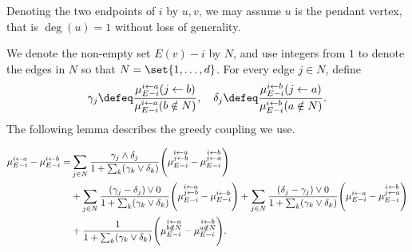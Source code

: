 \documentclass[a4paper,11pt]{article}
\begin{document}
Denoting the two endpoints of $i$ by $u, v$, we may assume $u$ is the pendant vertex, that is $\deg(u) = 1$ without loss of generality.
    
We denote the non-empty set $E(v)-i$ by $N$, and use integers from $1$ to denote the edges in $N$ so that $N = \set{1, \ldots, d}$. For every edge $j\in N$, define
\begin{align*}
    \gamma_j\defeq \frac{\pab}{\pan}, \quad
    \delta_j\defeq \frac{\pba}{\pbn}.
\end{align*}
The following lemma describes the greedy coupling we use.
\begin{lemma}
    \begin{align*}
        \ma-\mb
          =&\sum_{j\in N}\frac{\gamma_j\wedge\delta_j}{\zzz}\Bigg(\mab - \mba\Bigg)
        \\&+\sum_{j\in N}\frac{(\gamma_j-\delta_j)\vee 0}{\zzz}\Bigg(\mab-\mb\Bigg)
           +\sum_{j\in N}\frac{(\delta_j-\gamma_j)\vee 0}{\zzz}\Bigg(\ma-\mba\Bigg)
        \\&+\frac{1}{\zzz}\Bigg(\man-\mbn\Bigg).
    \end{align*}
\end{lemma}
\end{document}

